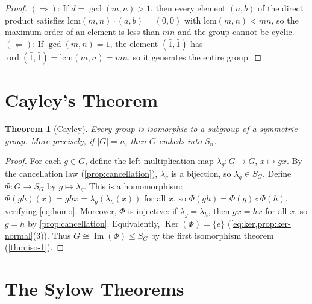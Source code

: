 \documentclass[12pt,a4paper]{article}
\theoremstyle{definition}
\theoremstyle{plain}
\newtheorem{theorem}[definition]{Theorem}
\theoremstyle{remark}
\newcommand{\Ker}{\operatorname{Ker}}
\newcommand{\Img}{\operatorname{Im}}
\newcommand{\ord}{\operatorname{ord}}
\begin{document}
\begin{proof}
$(\Rightarrow)$: If $d = \gcd(m,n) > 1$, then every element $(a,b)$ of the direct
product satisfies $\text{lcm}(m,n) \cdot (a,b) = (0,0)$
with $\text{lcm}(m,n) < mn$, so the maximum order of an element 
is less than $mn$ and the group cannot be cyclic.
$(\Leftarrow)$: If $\gcd(m,n) = 1$, the element $(\bar{1}, \bar{1})$ has
$\ord(\bar{1}, \bar{1}) = \text{lcm}(m,n) = mn$, so it
generates the entire group.
\end{proof}


\section{Cayley's Theorem}\label{sec:cayley}

\begin{theorem}[Cayley]\label{thm:cayley}
Every group is isomorphic to a subgroup of a symmetric group. More precisely, if $|G| = n$, then $G$ embeds into $S_n$.
\end{theorem}

\begin{proof}
For each $g \in G$, define the left multiplication map $\lambda_g \colon G \to G$,
$x \mapsto gx$. By the cancellation law (\cref{prop:cancellation}), $\lambda_g$ is
a bijection, so $\lambda_g \in S_G$.
Define $\Phi \colon G \to S_G$ by $g \mapsto \lambda_g$.
This is a homomorphism: $\Phi(gh)(x) = ghx = \lambda_g(\lambda_h(x))$
for all $x$, so $\Phi(gh) = \Phi(g) \circ \Phi(h)$, verifying \cref{eq:homo}.
Moreover, $\Phi$ is injective: if $\lambda_g = \lambda_h$, then $gx = hx$ for all $x$,
so $g = h$ by \cref{prop:cancellation}. Equivalently, $\Ker(\Phi) = \{e\}$
(\cref{eq:ker,prop:ker-normal}(3)).
Thus $G \cong \Img(\Phi) \leq S_G$ by the first isomorphism theorem (\cref{thm:iso-1}).
\end{proof}


\section{The Sylow Theorems}\label{sec:sylow}
\end{document}
